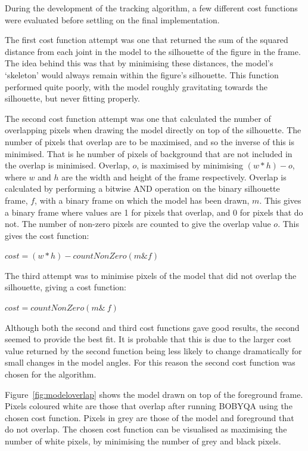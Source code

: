 During the development of the tracking algorithm, a few different cost functions were evaluated before settling on the final implementation.

The first cost function attempt was one that returned the sum of the squared distance from each joint in the model to the silhouette of the figure in the frame. The idea behind this was that by minimising these distances, the model's `skeleton' would always remain within the figure's silhouette. This function performed quite poorly, with the model roughly gravitating towards the silhouette, but never fitting properly.

The second cost function attempt was one that calculated the number of overlapping pixels when drawing the model directly on top of the silhouette. The number of pixels that overlap are to be maximised, and so the inverse of this is minimised. That is he number of pixels of background that are not included in the overlap is minimised. Overlap, $o$, is maximised by minimising $(w * h) - o$, where $w$ and $h$ are the width and height of the frame respectively. Overlap is calculated by performing a bitwise AND operation on the binary silhouette frame, $f$, with a binary frame on which the model has been drawn, $m$. This gives a binary frame where values are 1 for pixels that overlap, and 0 for pixels that do not. The number of non-zero pixels are counted to give the overlap value $o$. This gives the cost function:

\centerline{$cost = (w * h) - countNonZero(m \& f)$}

The third attempt was to minimise pixels of the model that did not overlap the silhouette, giving a cost function:

\centerline{$cost = countNonZero(m \& ~f)$}

Although both the second and third cost functions gave good results, the second  seemed to provide the best fit. It is probable that this is due to the larger cost value returned by the second function being less likely to change dramatically for small changes in the model angles. For this reason the second cost function was chosen for the algorithm.

Figure~\ref{fig:modeloverlap} shows the model drawn on top of the foreground frame. Pixels coloured white are those that overlap after running BOBYQA using the chosen cost function. Pixels in grey are those of the model and foreground that do not overlap. The chosen cost function can be visualised as maximising the number of white pixels, by minimising the number of grey and black pixels.

